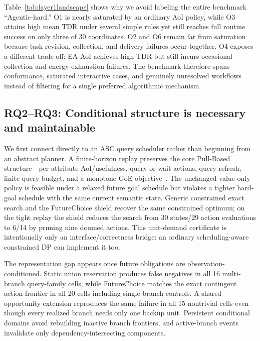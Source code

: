 \documentclass[conference]{IEEEtran}
\begin{document}
Table~\ref{tab:layer1landscape} shows why we avoid labeling the entire benchmark ``Agentic-hard.'' O1 is nearly saturated by an ordinary AoI policy, while O3 attains high mean TDR under several simple rules yet still reaches full routine success on only three of 30 coordinates. O2 and O6 remain far from saturation because task revision, collection, and delivery failures occur together. O4 exposes a different trade-off: EA-AoI achieves high TDR but still incurs occasional collection and energy-exhaustion failures. The benchmark therefore spans conformance, saturated interactive cases, and genuinely unresolved workflows instead of filtering for a single preferred algorithmic mechanism.

\subsection{RQ2--RQ3: Conditional structure is necessary and maintainable}
We first connect directly to an ASC query scheduler rather than beginning from an abstract planner. A finite-horizon replay preserves the core Pull-Based structure---per-attribute AoI/usefulness, query-or-wait actions, query refresh, finite query budget, and a monotone GoE objective~\cite{agheli2025pull}. The unchanged value-only policy is feasible under a relaxed future goal schedule but violates a tighter hard-goal schedule with the same current semantic state. Generic constrained exact search and the FutureChoice shield recover the same constrained optimum; on the tight replay the shield reduces the search from 30 states/29 action evaluations to 6/14 by pruning nine doomed actions. This unit-demand certificate is intentionally only an interface/correctness bridge: an ordinary scheduling-aware constrained DP can implement it too.

The representation gap appears once future obligations are observation-conditioned. Static union reservation produces false negatives in all 16 multi-branch query-family cells, while FutureChoice matches the exact contingent action frontier in all 20 cells including single-branch controls. A shared-opportunity extension reproduces the same failure in all 15 nontrivial cells even though every realized branch needs only one backup unit. Persistent conditional domains avoid rebuilding inactive branch frontiers, and active-branch events invalidate only dependency-intersecting components.
\end{document}
